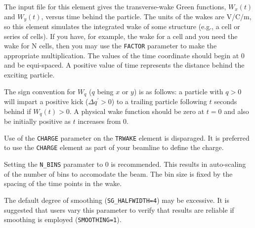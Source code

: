 The input file for this element gives the transverse-wake Green
functions, $W_x(t)$ and $W_y(t)$, versus time behind the particle. The
units of the wakes are V/C/m, so this element simulates the integrated
wake of some structure (e.g., a cell or series of cells).  If you
have, for example, the wake for a cell and you need the wake for N
cells, then you may use the {\tt FACTOR} parameter to make the
appropriate multiplication.  The values of the time coordinate should
begin at 0 and be equi-spaced.  A positive value of time represents
the distance behind the exciting particle.  

The sign convention for $W_q$ ($q$ being $x$ or $y$) is as follows: a
particle with $q>0$ will impart a positive kick ($\Delta q^\prime >
0$) to a trailing particle following $t$ seconds behind if $W_q(t)>0$.
A physical wake function should be zero at $t=0$ and also be initially
positive as $t$ increases from 0.

Use of the {\tt CHARGE} parameter on the {\tt TRWAKE} element is
disparaged.  It is preferred to use the {\tt CHARGE} element as part
of your beamline to define the charge.  

Setting the {\tt N\_BINS} paramater to 0 is recommended.  This results
in auto-scaling of the number of bins to accomodate the beam.  The bin
size is fixed by the spacing of the time points in the wake.

The default degree of smoothing ({\tt SG\_HALFWIDTH=4}) may be excessive.
It is suggested that users vary this parameter to verify that results
are reliable if smoothing is employed ({\tt SMOOTHING=1}).

